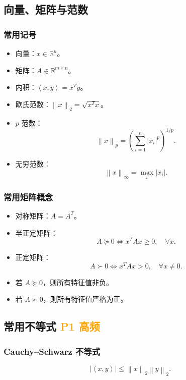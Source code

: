 \documentclass[11pt,a4paper]{ctexart}
\newcommand{\R}{\mathbb{R}}
\newcommand{\inner}[2]{\left\langle #1,#2 \right\rangle}
\newcommand{\norm}[1]{\left\lVert #1 \right\rVert}
\newcommand{\Pone}{\textcolor{orange}{\textbf{P1 高频}}}
\theoremstyle{definition}
\theoremstyle{plain}
\theoremstyle{remark}
\begin{document}
\subsection{向量、矩阵与范数}

\subsubsection*{常用记号}

\begin{itemize}
    \item 向量：$x \in \R^n$。
    \item 矩阵：$A \in \R^{m \times n}$。
    \item 内积：$\inner{x}{y} = x^T y$。
    \item 欧氏范数：$\norm{x}_2 = \sqrt{x^T x}$。
    \item $p$ 范数：
    \[
        \norm{x}_p = \left(\sum_{i=1}^n |x_i|^p\right)^{1/p}.
    \]
    \item 无穷范数：
    \[
        \norm{x}_\infty = \max_i |x_i|.
    \]
\end{itemize}

\subsubsection*{常用矩阵概念}

\begin{itemize}
    \item 对称矩阵：$A=A^T$。
    \item 半正定矩阵：
    \[
        A \succeq 0 \Longleftrightarrow x^T A x \ge 0,\quad \forall x.
    \]
    \item 正定矩阵：
    \[
        A \succ 0 \Longleftrightarrow x^T A x > 0,\quad \forall x\neq 0.
    \]
    \item 若 $A \succeq 0$，则所有特征值非负。
    \item 若 $A \succ 0$，则所有特征值严格为正。
\end{itemize}

\subsection{常用不等式 \Pone}

\subsubsection*{Cauchy--Schwarz 不等式}

\[
    |\inner{x}{y}| \le \norm{x}_2 \norm{y}_2.
\]
\end{document}
